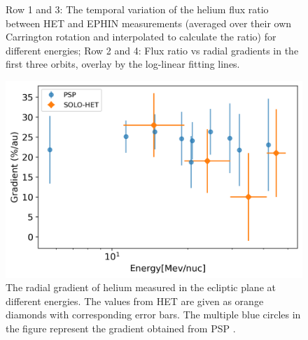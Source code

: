 \begin{figure}[!htb]
    \caption[Ratio of helium intensity between \ac{HET} and \ac{EPHIN} and helium radial gradient in different energy range]{Row 1 and 3: The temporal variation of the helium flux ratio between \ac{HET} and \ac{EPHIN} measurements (averaged over their own Carrington rotation and interpolated to calculate the ratio) for different energies; Row 2 and 4: Flux ratio vs radial gradients in the first three orbits, overlay by the log-linear fitting lines.} 
    \label{fig:ratio_radialgradient}
\end{figure}



\begin{figure}[!htb]
    \centering
    \includegraphics[scale = 0.8]{images/ACR/Energydependent_normal_mask20230612.png}
    \caption[Energy dependency of the helium radial gradient]{The radial gradient of helium measured in the ecliptic plane at different energies. The values from \ac{HET} are given as orange diamonds with corresponding error bars. The multiple blue circles in the figure represent the gradient obtained from \ac{PSP} \citep{Rankin2021ApJ}.}
    \label{fig:comparison_SOLO_PSP}
\end{figure}




